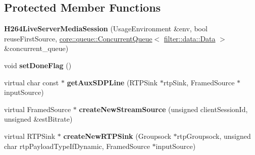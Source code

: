\subsection*{Protected Member Functions}
\begin{DoxyCompactItemize}
\item 
\mbox{\label{class_h264_live_server_media_session_ad5be284c8c0b5e1b479ccb87f85b644a}} 
{\bfseries H264\+Live\+Server\+Media\+Session} (Usage\+Environment \&env, bool reuse\+First\+Source, \hyperlink{classcore_1_1queue_1_1_concurrent_queue}{core\+::queue\+::\+Concurrent\+Queue}$<$ \hyperlink{classfilter_1_1data_1_1_data}{filter\+::data\+::\+Data} $>$ \&concurrent\+\_\+queue)
\item 
\mbox{\label{class_h264_live_server_media_session_a436efe803a54a77a0ba8ea4420f439f3}} 
void {\bfseries set\+Done\+Flag} ()
\item 
\mbox{\label{class_h264_live_server_media_session_a19e96a64dda50b5ee07603976089b0ef}} 
virtual char const  $\ast$ {\bfseries get\+Aux\+S\+D\+P\+Line} (R\+T\+P\+Sink $\ast$rtp\+Sink, Framed\+Source $\ast$input\+Source)
\item 
\mbox{\label{class_h264_live_server_media_session_a643871b4f55dfade6a4d71445d0f7a26}} 
virtual Framed\+Source $\ast$ {\bfseries create\+New\+Stream\+Source} (unsigned client\+Session\+Id, unsigned \&est\+Bitrate)
\item 
\mbox{\label{class_h264_live_server_media_session_a55ae1ef4c9316ce7925683a73fc52655}} 
virtual R\+T\+P\+Sink $\ast$ {\bfseries create\+New\+R\+T\+P\+Sink} (Groupsock $\ast$rtp\+Groupsock, unsigned char rtp\+Payload\+Type\+If\+Dynamic, Framed\+Source $\ast$input\+Source)
\end{DoxyCompactItemize}
